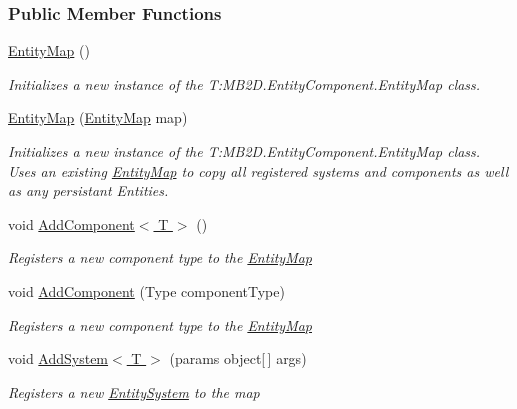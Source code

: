 \subsubsection*{Public Member Functions}
\begin{DoxyCompactItemize}
\item 
\hyperlink{class_m_b2_d_1_1_entity_component_1_1_entity_map_a3904c9181b806e476be24848837e1b53}{Entity\+Map} ()
\begin{DoxyCompactList}\small\item\em Initializes a new instance of the T\+:\+M\+B2\+D.\+Entity\+Component.\+Entity\+Map class. \end{DoxyCompactList}\item 
\hyperlink{class_m_b2_d_1_1_entity_component_1_1_entity_map_ac8f0662e42b90d8299e1044a1c429863}{Entity\+Map} (\hyperlink{class_m_b2_d_1_1_entity_component_1_1_entity_map}{Entity\+Map} map)
\begin{DoxyCompactList}\small\item\em Initializes a new instance of the T\+:\+M\+B2\+D.\+Entity\+Component.\+Entity\+Map class. Uses an existing \hyperlink{class_m_b2_d_1_1_entity_component_1_1_entity_map}{Entity\+Map} to copy all registered systems and components as well as any persistant Entities. \end{DoxyCompactList}\item 
void \hyperlink{class_m_b2_d_1_1_entity_component_1_1_entity_map_a3832e5a6ae181f71d002e81caf008da4}{Add\+Component$<$ T $>$} ()
\begin{DoxyCompactList}\small\item\em Registers a new component type to the \hyperlink{class_m_b2_d_1_1_entity_component_1_1_entity_map}{Entity\+Map} \end{DoxyCompactList}\item 
void \hyperlink{class_m_b2_d_1_1_entity_component_1_1_entity_map_aff9e50266b46d782c31c5b482b86540c}{Add\+Component} (Type component\+Type)
\begin{DoxyCompactList}\small\item\em Registers a new component type to the \hyperlink{class_m_b2_d_1_1_entity_component_1_1_entity_map}{Entity\+Map} \end{DoxyCompactList}\item 
void \hyperlink{class_m_b2_d_1_1_entity_component_1_1_entity_map_af2aefc425308f1ca680b0083f3acab0d}{Add\+System$<$ T $>$} (params object\mbox{[}$\,$\mbox{]} args)
\begin{DoxyCompactList}\small\item\em Registers a new \hyperlink{class_m_b2_d_1_1_entity_component_1_1_entity_system}{Entity\+System} to the map \end{DoxyCompactList}\item 

\end{DoxyCompactItemize}
